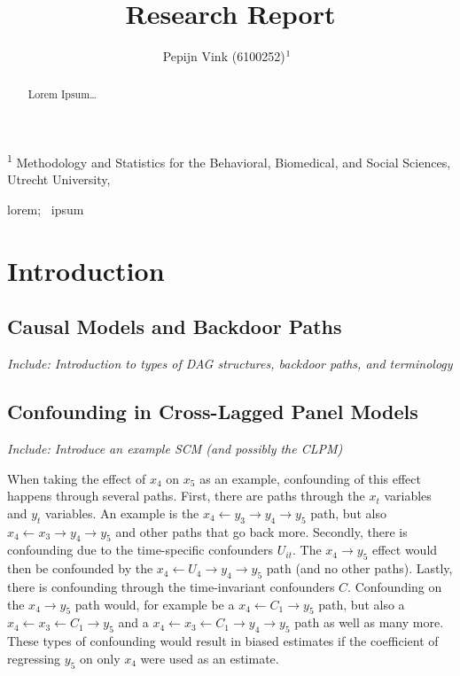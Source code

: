 \documentclass[
]{interact}
\title{Research Report}
\author{Pepijn Vink
(6100252)$\textsuperscript{1}$~\orcidlink{0000-0001-6960-9904}}
\begin{document}
\captionsetup{labelsep=space}
\maketitle
\textsuperscript{1} Methodology and Statistics for the Behavioral,
Biomedical, and Social Sciences, Utrecht University,  
\begin{abstract}
Lorem Ipsum\ldots{}
\end{abstract}
\begin{keywords}
\def\sep{;\ }
lorem\sep 
ipsum
\end{keywords}
\ifdefined\Shaded\renewenvironment{Shaded}{\begin{tcolorbox}[breakable, enhanced, frame hidden, boxrule=0pt, interior hidden, sharp corners, borderline west={3pt}{0pt}{shadecolor}]}{\end{tcolorbox}}\fi

\newcommand{\indep}{\perp \!\!\! \perp}

\hypertarget{introduction}{%
\section{Introduction}\label{introduction}}

\hypertarget{causal-models-and-backdoor-paths}{%
\subsection{Causal Models and Backdoor
Paths}\label{causal-models-and-backdoor-paths}}

\emph{Include: Introduction to types of DAG structures, backdoor paths,
and terminology}

\hypertarget{confounding-in-cross-lagged-panel-models}{%
\subsection{Confounding in Cross-Lagged Panel
Models}\label{confounding-in-cross-lagged-panel-models}}

\emph{Include: Introduce an example SCM (and possibly the CLPM)}

When taking the effect of \(x_4\) on \(x_5\) as an example, confounding
of this effect happens through several paths. First, there are paths
through the \(x_t\) variables and \(y_t\) variables. An example is the
\(x_4 \leftarrow y_3 \rightarrow y_4 \rightarrow y_5\) path, but also
\(x_4 \leftarrow x_3 \rightarrow y_4 \rightarrow y_5\) and other paths
that go back more. Secondly, there is confounding due to the
time-specific confounders \(U_{it}\). The \(x_4 \rightarrow y_5\) effect
would then be confounded by the
\(x_4 \leftarrow U_4 \rightarrow y_4 \rightarrow y_5\) path (and no
other paths). Lastly, there is confounding through the time-invariant
confounders \(C\). Confounding on the \(x_4 \rightarrow y_5\) path
would, for example be a \(x_4 \leftarrow C_1 \rightarrow y_5\) path, but
also a \(x_4 \leftarrow x_3 \leftarrow C_1 \rightarrow y_5\) and a
\(x_4 \leftarrow x_3 \leftarrow C_1 \rightarrow y_4 \rightarrow y_5\)
path as well as many more. These types of confounding would result in
biased estimates if the coefficient of regressing \(y_5\) on only
\(x_4\) were used as an estimate.
\end{document}
